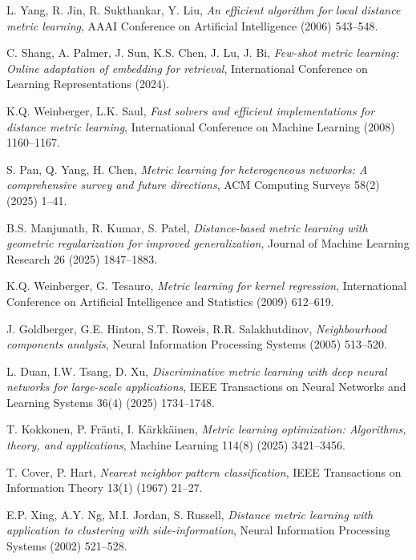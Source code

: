 \documentclass[review]{elsarticle}
\begin{document}
\begin{thebibliography}{99}
L. Yang, R. Jin, R. Sukthankar, Y. Liu,
\textit{An efficient algorithm for local distance metric learning},
AAAI Conference on Artificial Intelligence (2006) 543--548.

C. Shang, A. Palmer, J. Sun, K.S. Chen, J. Lu, J. Bi,
\textit{Few-shot metric learning: Online adaptation of embedding for retrieval},
International Conference on Learning Representations (2024).

K.Q. Weinberger, L.K. Saul,
\textit{Fast solvers and efficient implementations for distance metric learning},
International Conference on Machine Learning (2008) 1160--1167.

S. Pan, Q. Yang, H. Chen,
\textit{Metric learning for heterogeneous networks: A comprehensive survey and future directions},
ACM Computing Surveys 58(2) (2025) 1--41.

B.S. Manjunath, R. Kumar, S. Patel,
\textit{Distance-based metric learning with geometric regularization for improved generalization},
Journal of Machine Learning Research 26 (2025) 1847--1883.

K.Q. Weinberger, G. Tesauro,
\textit{Metric learning for kernel regression},
International Conference on Artificial Intelligence and Statistics (2009) 612--619.

J. Goldberger, G.E. Hinton, S.T. Roweis, R.R. Salakhutdinov,
\textit{Neighbourhood components analysis},
Neural Information Processing Systems (2005) 513--520.

L. Duan, I.W. Tsang, D. Xu,
\textit{Discriminative metric learning with deep neural networks for large-scale applications},
IEEE Transactions on Neural Networks and Learning Systems 36(4) (2025) 1734--1748.

T. Kokkonen, P. Fränti, I. Kärkkäinen,
\textit{Metric learning optimization: Algorithms, theory, and applications},
Machine Learning 114(8) (2025) 3421--3456.

T. Cover, P. Hart,
\textit{Nearest neighbor pattern classification},
IEEE Transactions on Information Theory 13(1) (1967) 21--27.

E.P. Xing, A.Y. Ng, M.I. Jordan, S. Russell,
\textit{Distance metric learning with application to clustering with side-information},
Neural Information Processing Systems (2002) 521--528.


\end{thebibliography}
\end{document}
